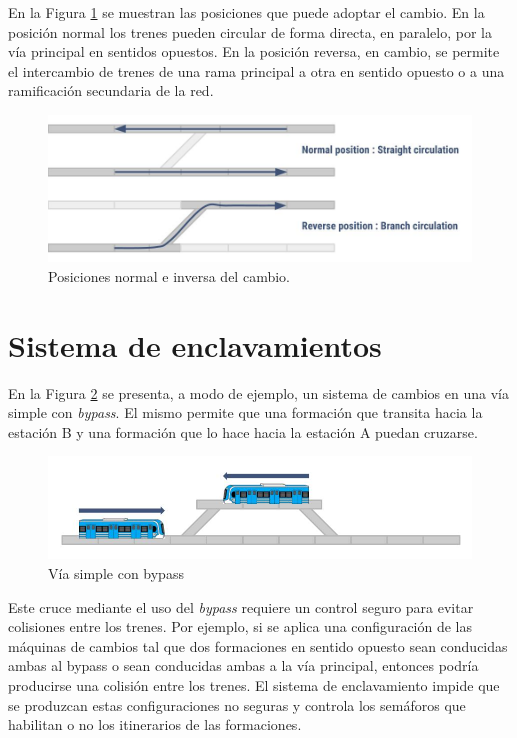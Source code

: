 			En la Figura \ref{fig:Cambios} se muestran las posiciones que puede adoptar el cambio. En la posición normal los trenes pueden circular de forma directa, en paralelo, por la vía principal en sentidos opuestos. En la posición reversa, en cambio, se permite el intercambio de trenes de una rama principal a otra en sentido opuesto o a una ramificación secundaria de la red.
			
			\begin{figure}[h!]
				\centering
				\includegraphics[scale=.45]{./Figures/Cambios}
				\caption{Posiciones normal e inversa del cambio.}
				\label{fig:Cambios}
			\end{figure} 
		
					
	\section{Sistema de enclavamientos}
	

		En la Figura \ref{fig:Bypass} se presenta, a modo de ejemplo, un sistema de cambios en una vía simple con \emph{bypass}. El mismo permite que una formación que transita hacia la estación B y una formación que lo hace hacia la estación A puedan cruzarse.
	
		\begin{figure}[h!]
			\centering
			\includegraphics[scale=.45]{./Figures/Bypass_2}
			\caption{Vía simple con bypass}
			\label{fig:Bypass}
		\end{figure}
				
		Este cruce mediante el uso del \emph{bypass} requiere un control seguro para evitar colisiones entre los trenes. Por ejemplo, si se aplica una configuración de las máquinas de cambios tal que dos formaciones en sentido opuesto sean conducidas ambas al bypass o sean conducidas ambas a la vía principal, entonces podría producirse una colisión entre los trenes. El sistema de enclavamiento impide que se produzcan estas configuraciones no seguras y controla los semáforos que habilitan o no los itinerarios de las formaciones.
	 
